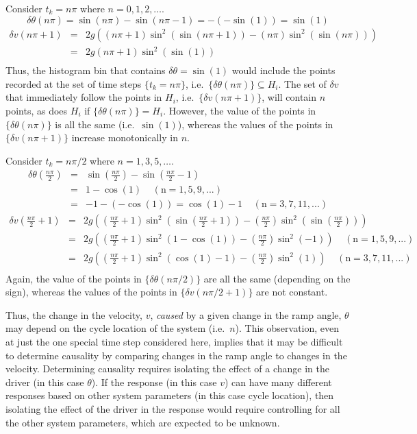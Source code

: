 \documentclass[a4paper,11pt]{article}
\begin{document}
Consider $t_k = n\pi$ where $n=0,1,2,\ldots$.  
$$
\delta\theta(n\pi) = \sin(n\pi) - \sin(n\pi-1) = -\left(-\sin(1)\right) = \sin(1)
$$
\begin{eqnarray*}
\delta v(n\pi+1) &=& 2g\left(\left(n\pi+1\right)\sin^2 \left(\sin(n\pi+1)\right) - \left(n\pi\right)\sin^2 \left(\sin(n\pi)\right) \right)\\
&=& 2g\left(n\pi+1\right)\sin^2 \left(\sin(1)\right)\\
\end{eqnarray*}
Thus, the histogram bin that contains $\delta\theta = \sin(1)$ would include the points recorded at the set of time steps $\{t_k = n\pi\}$, i.e.\ $\{\delta\theta(n\pi)\}\subseteq H_i$.  The set of $\delta v$ that immediately follow the points in $H_i$, i.e.\ $\{\delta v(n\pi+1)\}$, will contain $n$ points, as does $H_i$ if $\{\delta\theta(n\pi)\}= H_i$.  However, the value of the points in $\{\delta\theta(n\pi)\}$ is all the same (i.e.\ $\sin(1)$), whereas the values of the points in $\{\delta v(n\pi+1)\}$ increase monotonically in $n$.  

Consider $t_k = n\pi/2$ where $n=1,3,5,\ldots$.  
\begin{eqnarray*}
\delta\theta\left(\frac{n\pi}{2}\right) &=& \sin\left(\frac{n\pi}{2}\right) - \sin(\frac{n\pi}{2}-1)\\
&=& 1-\cos(1) \;\;\;\;\mathrm{(n = 1,5,9,...)}\\
&=& -1-\left(-\cos(1)\right) = \cos(1)-1 \;\;\;\;\mathrm{(n = 3,7,11,...)}
\end{eqnarray*}
\begin{eqnarray*}
\delta v(\frac{n\pi}{2}+1) &=& 2g\left(\left(\frac{n\pi}{2}+1\right)\sin^2 \left(\sin(\frac{n\pi}{2}+1)\right) - \left(\frac{n\pi}{2}\right)\sin^2 \left(\sin(\frac{n\pi}{2})\right) \right)\\
&=& 2g\left(\left(\frac{n\pi}{2}+1\right)\sin^2 \left(1-\cos(1)\right) - \left(\frac{n\pi}{2}\right)\sin^2 \left(-1\right) \right)\;\;\;\;\mathrm{(n = 1,5,9,...)}\\
&=& 2g\left(\left(\frac{n\pi}{2}+1\right)\sin^2 \left(\cos(1)-1\right) - \left(\frac{n\pi}{2}\right)\sin^2 \left(1\right) \right)\;\;\;\;\mathrm{(n = 3,7,11,...)}\\
\end{eqnarray*}
Again, the value of the points in $\{\delta\theta(n\pi/2)\}$ are all the same (depending on the sign), whereas the values of the points in $\{\delta v(n\pi/2+1)\}$ are not constant.

Thus, the change in the velocity, $v$, {\em caused} by a given change in the ramp angle, $\theta$ may depend on the cycle location of the system (i.e.\ $n$).  This observation, even at just the one special time step considered here, implies that it may be difficult to determine causality by comparing changes in the ramp angle to changes in the velocity.  Determining causality requires isolating the effect of a change in the driver (in this case $\theta$).  If the response (in this case $v$) can have many different responses based on other system parameters (in this case cycle location), then isolating the effect of the driver in the response would require controlling for all the other system parameters, which are expected to be unknown.
\end{document}

